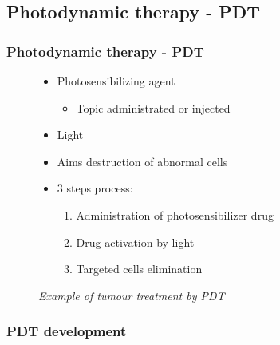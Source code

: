 \documentclass[aspectratio=169,fleqn,table]{beamer}
\begin{document}
\subsection{Photodynamic therapy - PDT}
\begingroup
{}
\begin{frame}
\frametitle{Photodynamic therapy - PDT}

\begin{figure}
\centering
\begin{minipage}[border=15pt]{0.45\textwidth}
	\centering
	\vspace{-165pt}
    \begin{itemize}
        \item
        Photosensibilizing agent
        \begin{itemize}
            \item
            Topic administrated or injected
        \end{itemize}
        \item
        Light
        \item
        Aims destruction of abnormal cells
        \item
        3 steps process:
        \begin{enumerate}
            \item{Administration of photosensibilizer drug}
            \item{Drug activation by light}
            \item{Targeted cells elimination}
        \end{enumerate}
    \end{itemize}
\end{minipage}
\hfill
\begin{minipage}[b]{0.54\textwidth}
	\centering
	\vspace{-10pt}
    \caption {%
    \textit{Example of tumour treatment by PDT}}
\end{minipage}
\end{figure}

\end{frame}
\endgroup


\begin{frame}[plain]
\frametitle{PDT development}

\vspace{-35pt}
\begin{figure}[border=1pt]
\end{figure}

\end{frame}
\end{document}
